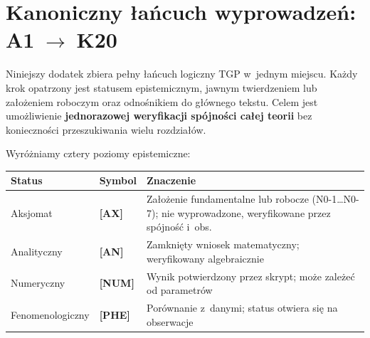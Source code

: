 %
%
%

\section{Kanoniczny \l{}a\'ncuch wyprowadze\'n: A1\texorpdfstring{$\;\to\;$}{→}K20}%
\label{app:lancuch}

Niniejszy dodatek zbiera pe\l{}ny \l{}a\'ncuch logiczny TGP w~jednym
miejscu. Ka\.zdy krok opatrzony jest statusem epistemicznym, jawnym
twierdzeniem lub za\l{}o\.zeniem roboczym oraz odno\'snikiem do
g\l{}\'ownego tekstu. Celem jest umo\.zliwienie \textbf{jednorazowej
weryfikacji sp\'ojno\'sci ca\l{}ej teorii} bez konieczno\'sci
przeszukiwania wielu rozdzia\l{\'ow}.

\medskip
\noindent{}
\medskip

Wyr\'o\.zniamy cztery poziomy epistemiczne:
\begin{center}
\begin{tabular}{@{}llp{9.5cm}@{}}
\toprule
\textbf{Status} & \textbf{Symbol} & \textbf{Znaczenie} \\
\midrule
Aksjomat & \textbf{[AX]} & Za\l{}o\.zenie fundamentalne lub robocze (N0-1\ldots N0-7);
  nie wyprowadzone, weryfikowane przez sp\'ojno\'s\'c i~obs.\ \\
Analityczny & \textbf{[AN]} & Zamkni\k{e}ty wniosek matematyczny;
  wery\-fikowany algebraicznie \\
Numeryczny & \textbf{[NUM]} & Wynik potwierdzony przez skrypt;
  mo\.ze zale\.ze\'c od parametr\'ow \\
Fenomenologiczny & \textbf{[PHE]} & Por\'ownanie z~danymi;
  status otwiera si\k{e} na obserwacje \\
\bottomrule
\end{tabular}
\end{center}

